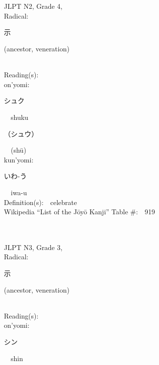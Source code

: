 \begin{multicols}{2}
\ \ \\
{\fontsize{34pt}{40pt}  }\ \ \\  %
{JLPT N2, Grade 4, \\Radical:\ \ {\begin{CJK}{UTF8}{min} 示 \end{CJK}} (ancestor, veneration) } \\
Reading(s):\ \ \\
{\hspace*{1em}}on'yomi:\ \ \\
{\hspace*{2em}}{\begin{CJK}{UTF8}{min} シュク \end{CJK}}\ \ shuku\ \ \\
{\hspace*{2em}}{\begin{CJK}{UTF8}{min} （シュウ） \end{CJK}}\ \ (sh\=u)\ \ \\
{\hspace*{1em}}kun'yomi:\ \ \\
{\hspace*{2em}}{\begin{CJK}{UTF8}{min} いわ-う \end{CJK}}\ \ iwa-u\ \ \\
Definition(s):\ \ celebrate \\
Wikipedia ``List of the J\=oy\=o Kanji'' Table \#:\ \ 919 \\
\ \ \\
{\fontsize{34pt}{40pt}  }\ \ \\  %
{JLPT N3, Grade 3, \\Radical:\ \ {\begin{CJK}{UTF8}{min} 示 \end{CJK}} (ancestor, veneration) } \\
Reading(s):\ \ \\
{\hspace*{1em}}on'yomi:\ \ \\
{\hspace*{2em}}{\begin{CJK}{UTF8}{min} シン \end{CJK}}\ \ shin\ \ \\

\end{multicols}
